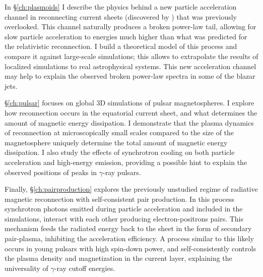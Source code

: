 In \S\ref{ch:plasmoids} I describe the physics behind a new particle acceleration channel in reconnecting current sheets (discovered by \citealt{2018MNRAS.481.5687P}) that was previously overlooked. This channel naturally produces a broken power-law tail, allowing for slow particle acceleration to energies much higher than what was predicted for the relativistic reconnection. I build a theoretical model of this process and compare it against large-scale simulations; this allows to extrapolate the results of localized simulations to real astrophysical systems. This new acceleration channel may help to explain the observed broken power-law spectra in some of the blazar jets. 

\S\ref{ch:pulsar} focuses on global 3D simulations of pulsar magnetospheres. I explore how reconnection occurs in the equatorial current sheet, and what determines the amount of magnetic energy dissipation. I demonstrate that the plasma dynamics of reconnection at microscopically small scales compared to the size of the magnetosphere uniquely determine the total amount of magnetic energy dissipation. I also study the effects of synchrotron cooling on both particle acceleration and high-energy emission, providing a possible hint to explain the observed positions of peaks in $\gamma$-ray pulsars.

Finally, \S\ref{ch:pairproduction} explores the previously unstudied regime of radiative magnetic reconnection with self-consistent pair production. In this process synchrotron photons emitted during particle acceleration and included in the simulations, interact with each other producing electron-positrons pairs. This mechanism feeds the radiated energy back to the sheet in the form of secondary pair-plasma, inhibiting the acceleration efficiency. A process similar to this likely occurs in young pulsars with high spin-down power, and self-consistently controls the plasma density and magnetization in the current layer, explaining the universality of $\gamma$-ray cutoff energies.
